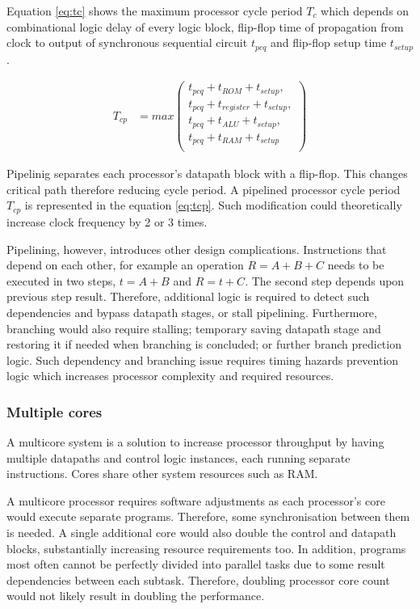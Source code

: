 Equation \ref{eq:tc} shows the maximum processor cycle period $T_c$ which depends on combinational logic delay of every logic block, flip-flop time of propagation from clock to output of synchronous sequential circuit $t_{pcq}$ and flip-flop setup time $t_{setup}$.

\begin{align}\label{eq:tcp}
	T_{cp} &= max \left( \begin{matrix}
	t_{pcq} + t_{ROM} + t_{setup},\\
	t_{pcq} + t_{register} + t_{setup},\\
	t_{pcq} + t_{ALU} + t_{setup},\\
	t_{pcq} + t_{RAM} + t_{setup}\\
	\end{matrix}\right)
\end{align}

Pipelinig separates each processor's datapath block with a flip-flop. This changes critical path therefore reducing cycle period. A pipelined processor cycle period $T_{cp}$ is represented in the equation \ref{eq:tcp}. Such modification could theoretically increase clock frequency by 2 or 3 times.

Pipelining, however, introduces other design complications. Instructions that depend on each other, for example an operation $R = A + B + C$ needs to be executed in two steps, $t = A + B$ and $R = t + C$. The second step depends upon previous step result. Therefore, additional logic is required to detect such dependencies and bypass datapath stages, or stall pipelining. Furthermore, branching would also require stalling; temporary saving datapath stage and restoring it if needed when branching is concluded; or further branch prediction logic. Such dependency and branching issue requires timing hazards prevention logic which increases processor complexity and required resources. 

\subsubsection{Multiple cores}

A multicore system is a solution to increase processor throughput by having multiple datapaths and control logic instances, each running separate instructions. Cores share other system resources such as RAM.

A multicore processor requires software adjustments as each processor's core would execute separate programs. Therefore, some synchronisation between them is needed. A single additional core would also double the control and datapath blocks, substantially increasing resource requirements too. In addition, programs most often cannot be perfectly divided into parallel tasks due to some result dependencies between each subtask. Therefore, doubling processor core count would not likely result in doubling the performance. 


